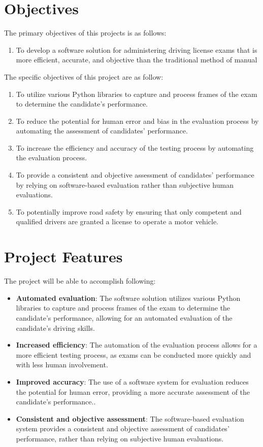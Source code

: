 \section{Objectives}
The primary objectives of this projects is as follows:
\vspace{-18pt}
\begin{enumerate}
\item To develop a software solution for administering driving license exams that is more efficient, accurate, and objective than the traditional method of manual 
\end{enumerate}

The specific objectives of this project are as follow:
\vspace{-18pt}
\begin{enumerate}
\item To utilize various Python libraries to capture and process frames of the exam to determine the candidate's performance.
\item  To reduce the potential for human error and bias in the evaluation process by automating the assessment of candidates' performance.
\item To increase the efficiency and accuracy of the testing process by automating the evaluation process.
\item  To provide a consistent and objective assessment of candidates' performance by relying on software-based evaluation rather than subjective human evaluations.
\item To potentially improve road safety by ensuring that only competent and qualified drivers are granted a license to operate a motor vehicle.
\end{enumerate}

\section{Project Features}
The project will be able to accomplish following:
\vspace{-18pt}
\begin{itemize}
\item \textbf{Automated evaluation}: The software solution utilizes various Python libraries to capture and process frames of the exam to determine the candidate's performance, allowing for an automated evaluation of the candidate's driving skills.
\item \textbf{Increased efficiency}: The automation of the evaluation process allows for a more efficient testing process, as exams can be conducted more quickly and with less human involvement.
\item \textbf{Improved accuracy}: The use of a software system for evaluation reduces the potential for human error, providing a more accurate assessment of the candidate's performance..
\item \textbf{Consistent and objective assessment}: The software-based evaluation system provides a consistent and objective assessment of candidates' performance, rather than relying on subjective human evaluations.
\end{itemize}

